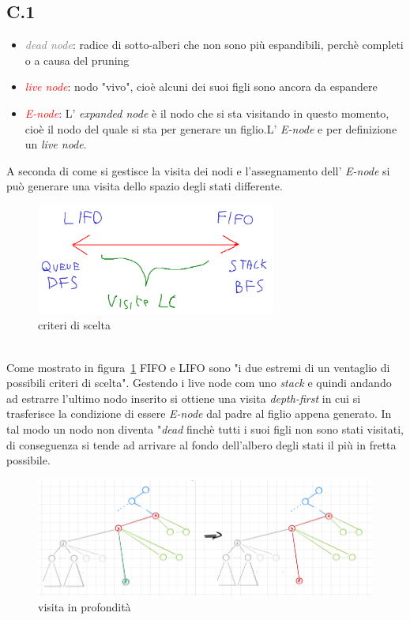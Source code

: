 \documentclass[a4paper]{article}
\begin{document}
\subsection{C.1}
\label{SEC:C_1}
\begin{itemize}
	\item \textcolor{gray}{\textit{dead node}}: radice di sotto-alberi che non sono più espandibili, perchè completi o a causa del pruning
		\item \textcolor{red}{\textit{live node}}: nodo "vivo", cioè alcuni dei suoi figli sono ancora da espandere
		\item \textcolor{red}{\textit{E-node}}: L' \textit{expanded node} è il nodo che si sta visitando in questo momento, cioè il nodo del quale si sta per generare un figlio.L' \textit{E-node} e per definizione un \textit{live node}.
\end{itemize}
A seconda di come si gestisce la visita dei nodi e l'assegnamento dell' \textit{E-node} si può generare una visita dello spazio degli stati differente.
\begin{figure}[!ht]
\centering
\includegraphics[width=0.7\textwidth]{./img/C_1.png}
\caption{criteri di scelta} \label{FIG:C_1}
\end{figure}\\
Come mostrato in figura~\ref{FIG:C_1} FIFO e LIFO sono "i due estremi di un ventaglio di possibili criteri di scelta".
Gestendo i live node com uno \emph{stack} e quindi andando ad estrarre l'ultimo nodo inserito si ottiene una visita \textit{depth-first} in cui si trasferisce la condizione di essere \textit{E-node} dal padre al figlio appena generato.
In tal modo un nodo non diventa "\emph{dead} finchè tutti i suoi figli non sono stati visitati, di conseguenza si tende ad arrivare al fondo dell'albero degli stati il più in fretta possibile.
\begin{figure}[!ht]
\centering
\includegraphics[width=1\textwidth]{./img/C_1_DFS.png}
\caption{visita in profondità} \label{FIG:C_1_DFS}
\end{figure}\\
\end{document}

